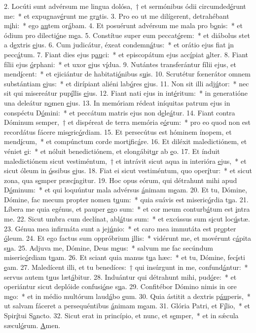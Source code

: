 2. Locúti sunt advérsum me lingua dolósa,~† et sermónibus ódii circumded\uline{é}runt me:~* et expugnav\uline{é}runt me gr\uline{a}tis.
3. Pro eo ut me dilígerent, detrahébant m\uline{i}hi:~* ego \uline{au}tem or\uline{á}bam.
4. Et posuérunt advérsum me mala pro b\uline{o}nis:~* et ódium pro dilecti\uline{ó}ne m\uline{e}a.
5. Constítue super eum peccat\uline{ó}rem:~* et diábolus stet a d\uline{e}xtris \uline{e}jus.
6. Cum judicátur, éxeat condemn\uline{á}tus:~* et orátio ejus fiat \uline{i}n pecc\uline{á}tum.
7. Fiant dies ejus p\uline{au}ci:~* et episcopátum ejus acc\uline{í}piat \uline{a}lter.
8. Fiant fílii ejus \uline{ó}rphani:~* et uxor \uline{e}jus v\uline{í}dua.
9. Nutántes transferántur fílii ejus, et mend\uline{í}cent:~* et ejiciántur de habitati\uline{ó}nibus s\uline{u}is.
10. Scrutétur fœnerátor omnem substántiam \uline{e}jus:~* et dirípiant aliéni lab\uline{ó}res \uline{e}jus.
11. Non sit illi adj\uline{ú}tor:~* nec sit qui misereátur pup\uline{í}llis \uline{e}jus.
12. Fiant nati ejus in int\uline{é}ritum:~* in generatióne una deleátur n\uline{o}men \uline{e}jus.
13. In memóriam rédeat iníquitas patrum ejus in conspéctu D\uline{ó}mini:~* et peccátum matris ejus non d\uline{e}le\uline{á}tur.
14. Fiant contra Dóminum semper,~† et dispéreat de terra memória e\uline{ó}rum:~* pro eo quod non est recordátus fácere mis\uline{e}ric\uline{ó}rdiam.
15. Et persecútus est hóminem ínopem, et mend\uline{í}cum,~* et compúnctum corde mort\uline{i}fic\uline{á}re.
16. Et diléxit maledictiónem, et véniet \uline{e}i:~* et nóluit benedictiónem, et elongábit\uline{u}r ab \uline{e}o.
17. Et índuit maledictiónem sicut vestiméntum,~† et intrávit sicut aqua in interióra \uline{e}jus,~* et sicut óleum in \uline{ó}ssibus \uline{e}jus.
18. Fiat ei sicut vestiméntum, quo oper\uline{í}tur:~* et sicut zona, qua s\uline{e}mper præc\uline{í}ngitur.
19. Hoc opus eórum, qui détrahunt mihi apud D\uline{ó}minum:~* et qui loquúntur mala advérsus \uline{á}nimam m\uline{e}am.
20. Et tu, Dómine, Dómine, fac mecum propter nomen t\uline{u}um:~* quia suávis est miseric\uline{ó}rdia t\uline{u}a.
21. Líbera me quia egénus, et pauper \uline{e}go sum:~* et cor meum conturb\uline{á}tum est \uline{i}ntra me.
22. Sicut umbra cum declínat, abl\uline{á}tus sum:~* et excússus sum s\uline{i}cut loc\uline{ú}stæ.
23. Génua mea infirmáta sunt a jej\uline{ú}nio:~* et caro mea immutáta est pr\uline{o}pter \uline{ó}leum.
24. Et ego factus sum oppróbrium \uline{i}llis:~* vidérunt me, et movérunt c\uline{á}pita s\uline{u}a.
25. Adjuva me, Dómine, Deus m\uline{e}us:~* salvum me fac secúndum miseric\uline{ó}rdiam t\uline{u}am.
26. Et sciant quia manus t\uline{u}a hæc:~* et tu, Dómine, fec\uline{í}sti \uline{e}am.
27. Maledícent illi, et tu benedíces:~† qui insúrgunt in me, confund\uline{á}ntur:~* servus autem t\uline{u}us læt\uline{á}bitur.
28. Induántur qui détrahunt mihi, pud\uline{ó}re:~* et operiántur sicut deplóide confusi\uline{ó}ne s\uline{u}a.
29. Confitébor Dómino nimis in ore m\uline{e}o:~* et in médio multórum laud\uline{á}bo \uline{e}um.
30. Quia ástitit a dextris p\uline{áu}peris,~* ut salvam fáceret a persequéntibus \uline{á}nimam m\uline{e}am.
31. Glória Patri, et F\uline{í}lio,~* et Spir\uline{í}tui S\uline{a}ncto.
32. Sicut erat in princípio, et nunc, et s\uline{e}mper,~* et in sǽcula sæcul\uline{ó}rum. \uline{A}men.
